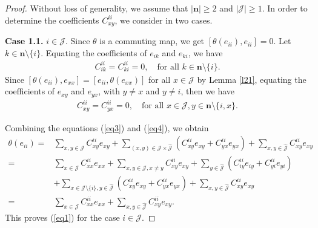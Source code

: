 \documentclass[reqno]{amsart}
\theoremstyle{plain}
\theoremstyle{definition}
\begin{document}
\begin{proof}
Without loss of generality, we assume that $|\mathbf{n}| \geq 2$ and $|\mathcal{J}| \geq 1$. In order to determine the coefficients $C_{xy}^{ii}$, we consider in two cases.

\textbf{Case 1.1.} $i \in \mathcal{J}$.
 Since $\theta$ is a commuting map,  we get $[\theta(e_{ii}), e_{ii}] = 0$. Let $k \in \mathbf{n} \setminus \{i\}$. Equating the coefficients of $e_{ik}$ and $e_{ki}$, we have
  \begin{align}\label{eq3}
  C_{ik}^{ii} = C_{ki}^{ii} = 0, \quad \text{for all } k \in \mathbf{n} \setminus \{i\}.
  \end{align}
Since $[\theta(e_{ii}), e_{xx}] = [e_{ii}, \theta(e_{xx})]$ for all $x \in \mathcal{J}$ by Lemma \ref{l21}, equating the coefficients of $e_{xy}$ and $e_{yx}$, with $y \neq x$ and $y \neq i$, then we have
 \begin{align}\label{eq4}
 C_{xy}^{ii} = C_{yx}^{ii} = 0, \quad \text{for all } x \in \mathcal{J}, y \in \mathbf{n} \setminus \{i,x\}.
 \end{align}

Combining the equations (\ref{eq3}) and (\ref{eq4}), we obtain
 \begin{align*}
 \theta(e_{ii})=& \sum_{x,y \in \mathcal{J}} C_{xy}^{ii} e_{xy}
 +\sum_{(x,y) \in \mathcal{J} \times \hat{\mathcal{J}}} (C_{xy}^{ii} e_{xy}+C_{yx}^{ii} e_{yx})+\sum_{x,y \in \hat{\mathcal{J}}} C_{xy}^{ii} e_{xy}\\
=&\sum_{x \in \mathcal{J}} C_{xx}^{ii} e_{xx} + \sum_{x,y \in \mathcal{J}, x\neq y} C_{xy}^{ii} e_{xy}
 +\sum_{y\in \hat{\mathcal{J}}} (C_{iy}^{ii} e_{iy}+C_{yi}^{ii} e_{yi})\\
  &+\sum_{x \in \mathcal{J}\setminus \{i\}, y\in \hat{\mathcal{J}}} (C_{xy}^{ii} e_{xy}+C_{yx}^{ii} e_{yx})+\sum_{x,y \in \hat{\mathcal{J}}} C_{xy}^{ii} e_{xy}\\
=& \sum_{x \in \mathcal{J}} C_{xx}^{ii} e_{xx} + \sum_{x, y \in \hat{\mathcal{J}}} C_{xy}^{ii} e_{xy}.
 \end{align*}
This proves (\ref{eq1}) for the case $ i \in \mathcal{J} $.


\end{proof}
\end{document}
